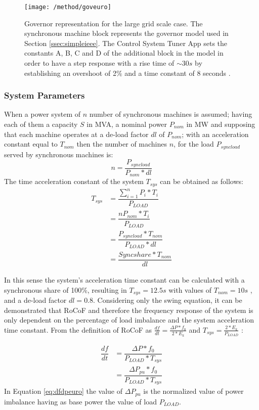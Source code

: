 \begin{figure}[h]
\centering
\texttt{[image: /method/goveuro]}
\caption{Governor representation for the large grid scale case. The synchronous machine block represents the governor model used in Section \ref{ssec:simpleieee}. The Control System Tuner App sets the constants A, B, C and D of the additional block in the model in order to have a step response with a rise time of $ \sim30s $ by establishing an overshoot of 2\% and a time constant of 8 seconds \cite{ogata1999ingenieria}.}
\label{fig:goveuro}
\end{figure}




\subsubsection{System Parameters}

When a power system of $ n $ number of synchronous machines is assumed; having each of them a capacity $ S $ in MVA, a nominal power $ P_{nom} $ in MW and
supposing that each machine operates at a de-load factor $ dl $ of $ P_{nom} $; with an acceleration constant equal to $ T_{nom} $ then the number of machines $ n $, for the load $ P_{syncload} $ served by synchronous machines is:
\begin{equation}
n=\dfrac{P_{syncload}}{P_{nom}*dl}
\end{equation}
The time acceleration constant of the system $ T_{sys} $ can be obtained as follows:
\begin{align}
T_{sys} &=\dfrac{\sum_{i=1}^nP_i*T_i}{P_{LOAD}}\nonumber \\
&=\dfrac{nP_{nom}*T_i}{P_{LOAD}}\nonumber \\
&=\dfrac{P_{syncload}*T_{nom}}{P_{LOAD}*dl}\nonumber\\
&=\dfrac{Sync share*T_{nom}}{dl} \label{eq:tsyseuro}
\end{align}




In this sense the system's acceleration time constant can be calculated with a synchronous share of 100\%, resulting in $ T_{sys}=12.5s $ with values of $ T_{nom}=10s $ \cite{ENTSOE.2016, Anderson.2002}, and a de-load factor $ dl=0.8 $. Considering only the swing equation, it can be demonstrated that RoCoF and therefore the frequency response of the system is only dependent on the percentage of load imbalance and the system acceleration time constant.
From the definition of RoCoF as $ \frac{df}{dt}=\frac{\Delta P*f_0}{2*E_k} $ and $ T_{sys}=\frac{2*E_k}{P_{LOAD}} $ :

\begin{align}
\dfrac{df}{dt} &=\dfrac{\Delta P*f_0}{P_{LOAD}*T_{sys}} \nonumber\\
&=\dfrac{\Delta P_{pu}*f_0}{P_{LOAD}*T_{sys}}
\label{eq:dfdpeuro}
\end{align}
In Equation \eqref{eq:dfdpeuro} the value of $ \Delta P_{pu} $ is the normalized value of power imbalance having as base power the value of load $ P_{LOAD} $.
